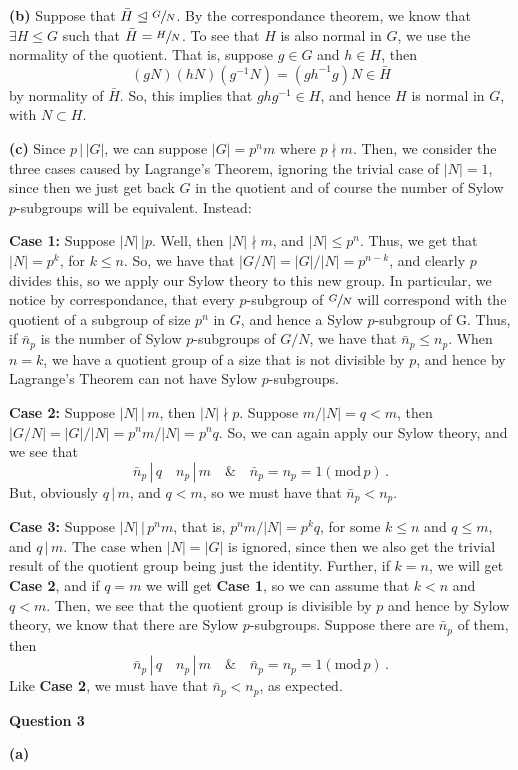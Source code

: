 \documentclass[10pt]{article}
\begin{document}
\textbf{(b)} Suppose that $\bar{H} \trianglelefteq \sfrac{G}{N}$. By the correspondance theorem, we know that $\exists H \leq G$ such that $\bar{H} = \sfrac{H}{N}$. To see that $H$ is also normal in $G$, we use the normality of the quotient. That is, suppose $g\in G$ and $h \in H$, then
\[ (gN)(hN)(g^{-1}N) = (gh^{-1}g)N \in \bar{H} \]
by normality of $\bar{H}$. So, this implies that $ghg^{-1} \in H$, and hence $H$ is normal in $G$, with $N\subset H$.

\textbf{(c)} Since $p \,| \,|G|$, we can suppose $|G| = p^{n}m$ where $p \nmid m$. Then, we consider the three cases caused by Lagrange's Theorem, ignoring the trivial case of $|N| = 1$, since then we just get back $G$ in the quotient and of course the number of Sylow $p$-subgroups will be equivalent. Instead:

\textbf{Case 1:} Suppose $|N| \, | p$. Well, then $|N| \nmid m$, and $|N| \leq p^{n}$. Thus, we get that $|N| = p^{k}$, for $k \leq n$. So, we have that $|G/N| = |G|/|N| = p^{n-k}$, and clearly $p$ divides this, so we apply our Sylow theory to this new group. In particular, we notice by correspondance, that every $p$-subgroup of $\sfrac{G}{N}$ will correspond with the quotient of a subgroup of size $p^{n}$ in $G$, and hence a Sylow $p$-subgroup of G. Thus, if $\bar{n}_{p}$ is the number of Sylow $p$-subgroups of $G/N$, we have that $\bar{n}_{p} \leq n_{p}$. When $n = k$, we have a quotient group of a size that is not divisible by $p$, and hence by Lagrange's Theorem can not have Sylow $p$-subgroups.

\textbf{Case 2:} Suppose $|N| \,| \,m$, then $|N| \nmid p$. Suppose $m/|N| = q < m$, then $|G/N| = |G|/|N| = p^{n}m/|N| = p^{n}q$. So, we can again apply our Sylow theory, and we see that
\[ \bar{n}_{p} \,| \,q \quad n_{p} \, | \,m \quad \& \quad \bar{n}_{p} = n_{p} = 1 (\text{mod}\, p) \, .\]
But, obviously $q \, | \, m$, and $q < m$, so we must have that $\bar{n}_{p} < n_{p}$.

\textbf{Case 3:} Suppose $|N| \, | \, p^{n}m$, that is, $p^{n}m/|N| = p^{k}q$, for some $k \leq n$ and $q \leq m$, and $q \, | \, m$. The case when $|N| = |G|$ is ignored, since then we also get the trivial result of the quotient group being just the identity. Further, if $k = n$, we will get \textbf{Case 2}, and if $q = m$ we will get \textbf{Case 1}, so we can assume that $k < n$ and $q < m$. Then, we see that the quotient group is divisible by $p$ and hence by Sylow theory, we know that there are Sylow $p$-subgroups. Suppose there are $\bar{n}_{p}$ of them, then
\[ \bar{n}_{p} \,| \,q \quad n_{p} \, | \,m \quad \& \quad \bar{n}_{p} = n_{p} = 1 (\text{mod}\, p) \, .\]
Like \textbf{Case 2}, we must have that $\bar{n}_{p} < n_{p}$, as expected.

\newpage
\textbf{Question 3}

\textbf{(a)}
\end{document}

